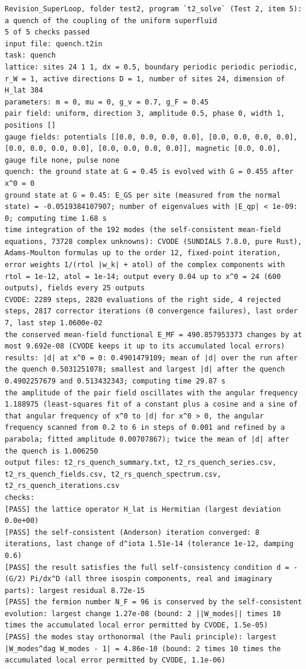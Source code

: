 \documentclass[
  10pt,
]{article}
\begin{document}
\begin{verbatim}
Revision_SuperLoop, folder test2, program `t2_solve` (Test 2, item 5): a quench of the coupling of the uniform superfluid
5 of 5 checks passed
input file: quench.t2in
task: quench
lattice: sites 24 1 1, dx = 0.5, boundary periodic periodic periodic, r_W = 1, active directions D = 1, number of sites 24, dimension of H_lat 384
parameters: m = 0, mu = 0, g_v = 0.7, g_F = 0.45
pair field: uniform, direction 3, amplitude 0.5, phase 0, width 1, positions []
gauge fields: potentials [[0.0, 0.0, 0.0, 0.0], [0.0, 0.0, 0.0, 0.0], [0.0, 0.0, 0.0, 0.0], [0.0, 0.0, 0.0, 0.0]], magnetic [0.0, 0.0], gauge file none, pulse none
quench: the ground state at G = 0.45 is evolved with G = 0.455 after x^0 = 0
ground state at G = 0.45: E_GS per site (measured from the normal state) = -0.0519384107907; number of eigenvalues with |E_qp| < 1e-09: 0; computing time 1.68 s
time integration of the 192 modes (the self-consistent mean-field equations, 73728 complex unknowns): CVODE (SUNDIALS 7.8.0, pure Rust), Adams-Moulton formulas up to the order 12, fixed-point iteration, error weights 1/(rtol |w_k| + atol) of the complex components with rtol = 1e-12, atol = 1e-14; output every 0.04 up to x^0 = 24 (600 outputs), fields every 25 outputs
CVODE: 2289 steps, 2820 evaluations of the right side, 4 rejected steps, 2817 corrector iterations (0 convergence failures), last order 7, last step 1.0600e-02
the conserved mean-field functional E_MF = 490.857953373 changes by at most 9.692e-08 (CVODE keeps it up to its accumulated local errors)
results: |d| at x^0 = 0: 0.4901479109; mean of |d| over the run after the quench 0.5031251078; smallest and largest |d| after the quench 0.4902257679 and 0.513432343; computing time 29.87 s
the amplitude of the pair field oscillates with the angular frequency 1.188975 (least-squares fit of a constant plus a cosine and a sine of that angular frequency of x^0 to |d| for x^0 > 0, the angular frequency scanned from 0.2 to 6 in steps of 0.001 and refined by a parabola; fitted amplitude 0.00707867); twice the mean of |d| after the quench is 1.006250
output files: t2_rs_quench_summary.txt, t2_rs_quench_series.csv, t2_rs_quench_fields.csv, t2_rs_quench_spectrum.csv, t2_rs_quench_iterations.csv
checks:
[PASS] the lattice operator H_lat is Hermitian (largest deviation 0.0e+00)
[PASS] the self-consistent (Anderson) iteration converged: 8 iterations, last change of d^iota 1.51e-14 (tolerance 1e-12, damping 0.6)
[PASS] the result satisfies the full self-consistency condition d = -(G/2) Pi/dx^D (all three isospin components, real and imaginary parts): largest residual 8.72e-15
[PASS] the fermion number N_F = 96 is conserved by the self-consistent evolution: largest change 1.27e-08 (bound: 2 ||W_modes|| times 10 times the accumulated local error permitted by CVODE, 1.5e-05)
[PASS] the modes stay orthonormal (the Pauli principle): largest |W_modes^dag W_modes - 1| = 4.86e-10 (bound: 2 times 10 times the accumulated local error permitted by CVODE, 1.1e-06)
\end{verbatim}
\end{document}

